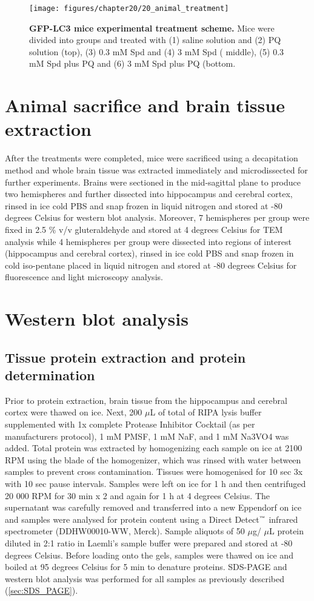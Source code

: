 \begin{figure}[!htbp]
  \texttt{[image: figures/chapter20/20\_animal\_treatment]}
  \caption[GFP-LC3 mice experimental treatment scheme]{\textbf{GFP-LC3 mice experimental treatment scheme.} Mice were divided into groups and treated with (1) saline solution and (2) PQ solution (top), (3) 0.3 mM Spd and (4) 3 mM Spd ( middle), (5) 0.3 mM Spd plus PQ and (6) 3 mM Spd plus PQ (bottom.}
  \label{fig:20_animal_treatment}
\end{figure}

\section{Animal sacrifice and brain tissue extraction}
After the treatments were completed, mice were sacrificed using a decapitation method and whole brain tissue was extracted immediately and microdissected for further experiments. Brains were sectioned in the mid-sagittal plane to produce two hemispheres and further dissected into hippocampus and cerebral cortex, rinsed in ice cold PBS and snap frozen in liquid nitrogen and stored at -80 degrees Celsius for western blot analysis. Moreover, 7 hemispheres per group were fixed in 2.5 \% v/v gluteraldehyde and stored at 4 degrees Celsius for TEM analysis while 4 hemispheres per group were dissected into regions of interest (hippocampus and cerebral cortex), rinsed in ice cold PBS and snap frozen in cold iso-pentane placed in liquid nitrogen and stored at -80 degrees Celsius for fluorescence and light microscopy analysis.

\section{Western blot analysis}
\subsection{Tissue protein extraction and protein determination}
Prior to protein extraction, brain tissue from the hippocampus and cerebral cortex were thawed on ice. Next, 200 $\mu$L of total of RIPA lysis buffer supplemented with 1x complete Protease Inhibitor Cocktail (as per manufacturers protocol), 1 mM PMSF, 1 mM NaF, and 1 mM Na3VO4 was added. Total protein was extracted by homogenizing each sample on ice at 2100 RPM using the blade of the homogenizer, which was rinsed with water between samples to prevent cross contamination. Tissues were homogenised for 10 sec 3x with 10 sec pause intervals. Samples were left on ice for 1 h and then centrifuged 20 000 RPM for 30 min x 2 and again for 1 h at 4 degrees Celsius. The supernatant was carefully removed and transferred into a new Eppendorf on ice and samples were analysed for protein content using a Direct Detect${\textsuperscript{\tiny{\texttrademark}}}$ infrared spectrometer (DDHW00010-WW, Merck). Sample aliquots of 50 $\mu$g/ $\mu$L protein diluted in 2:1 ratio in Laemli's sample buffer were prepared and stored at -80 degrees Celsius. Before loading onto the gels, samples were thawed on ice and boiled at 95 degrees Celsius for 5 min to denature proteins. SDS-PAGE and western blot analysis was performed for all samples as previously described (\cref{sec:SDS_PAGE}). 

